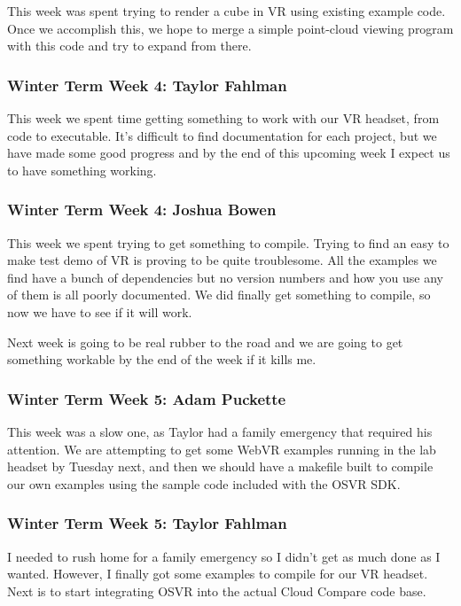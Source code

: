 \documentclass[draftclsnofoot,onecolumn]{IEEEtran}
\begin{document}
This week was spent trying to render a cube in VR using existing example code. Once we accomplish this, we hope to merge a simple point-cloud viewing program with this code and try to expand from there.

\subsubsection{Winter Term Week 4: Taylor Fahlman}

This week we spent time getting something to work with our VR headset, from code to executable. It's difficult to find documentation for each project, but we have made some good progress and by the end of this upcoming week I expect us to have something working.

\subsubsection{Winter Term Week 4: Joshua Bowen}

This week we spent trying to get something to compile. Trying to find an easy to make test demo of VR is proving to be quite troublesome. All the examples we find have a bunch of dependencies but no version numbers and how you use any of them is all poorly documented. We did finally get something to compile, so now we have to see if it will work.

Next week is going to be real rubber to the road and we are going to get something workable by the end of the week if it kills me.

\subsubsection{Winter Term Week 5: Adam Puckette}

This week was a slow one, as Taylor had a family emergency that required his attention. We are attempting to get some WebVR examples running in the lab headset by Tuesday next, and then we should have a makefile built to compile our own examples using the sample code included with the OSVR SDK.

\subsubsection{Winter Term Week 5: Taylor Fahlman}

I needed to rush home for a family emergency so I didn't get as much done as I wanted. However, I finally got some examples to compile for our VR headset. Next is to start integrating OSVR into the actual Cloud Compare code base.
\end{document}
